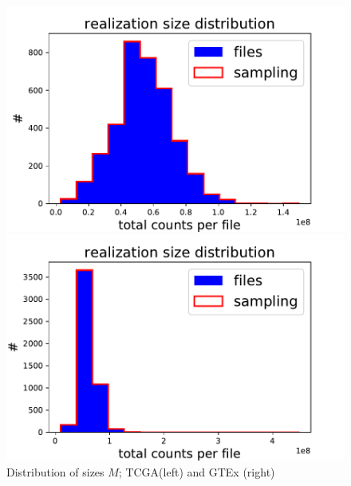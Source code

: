 \begin{figure}[htb!]
\begin{minipage}{0.5\textwidth}
    \centering
    \includegraphics[width=0.95\linewidth]{pictures/structure/tcga/sizeDistr_null.pdf}
\end{minipage}
\hspace{2mm}
\begin{minipage}{0.5\textwidth}
    \centering
    \includegraphics[width=0.95\linewidth]{pictures/structure/gtex/sizeDistr_null.pdf}
    \end{minipage}
\caption{Distribution of sizes $M$; TCGA(left) and GTEx (right)}
    \label{fig:structure/sizeDistr_null}
\end{figure}


